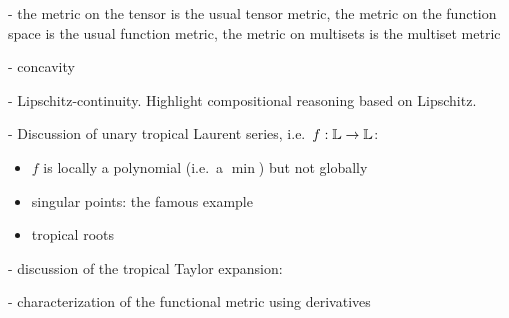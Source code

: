 

- the metric on the tensor is the usual tensor metric, the metric on the function space is the usual function metric, the metric on multisets is the multiset metric

- concavity

- Lipschitz-continuity. Highlight compositional reasoning based on Lipschitz.

- Discussion of unary tropical Laurent series, i.e.~$f:\mathbb{L} \to \mathbb{L}$:
\begin{itemize}

\item $f$ is locally a polynomial (i.e.~a $\min$) but not globally

\item singular points: the famous example

\item tropical roots


\end{itemize}



- discussion of the tropical Taylor expansion: 


- characterization of the functional metric using derivatives


